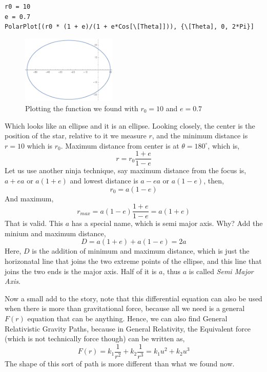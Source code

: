 \documentclass[12pt,a4paper]{article}
\begin{document}
\begin{verbatim}
r0 = 10
e = 0.7 
PolarPlot[(r0 * (1 + e)/(1 + e*Cos[\[Theta]])), {\[Theta], 0, 2*Pi}] 
\end{verbatim}

\begin{figure}[ht!]
    \centering
    \includegraphics[width=0.4\textwidth]{aellipse.pdf}
    \caption{Plotting the function we found with $r_0=10$ and $e = 0.7$}
    \label{fig:}
\end{figure}

Which looks like an ellipse and it is an ellipse. Looking closely, the center is the position of the star, relative to it we measure $r$, and the minimum distance is $r=10$ which is $r_0$. Maximum distance from center is at $\theta = 180^{\circ}$, which is, 
\[ 
r = r_0 \frac{1+ e}{1 - e}
\]
Let us use another ninja technique, say maximum distance from the focus is, $a + ea$ or $a \left( 1 +e \right) $ and lowest distance is $a - ea$ or $a \left( 1 -e \right) $, then, 
\[ 
    r_0 = a \left( 1 -e \right) 
\] 
And maximum,
\[ 
    r_{ max } = a\left( 1 -e \right) \frac{1+e}{1-e} = a\left( 1 + e \right) 
\] That is valid. 
This $a$ has a special name, which is semi major axis. Why? Add  the minium and maximum distance,
\[ 
    D = a(1+e) + a(1-e) = 2a
\]Here, $D$ is the addition of minimum and maximum distance, which is just the horizonatal line that joins the two extreme points of the ellipse, and this line that joins the two ends is the major axis. Half of it is $a$, thus $a$ is called  \emph{Semi Major Axis}.


Now a small add to the story, note  that this differential equation can also be used when there is more than gravitational force, because all we need is a general $F(r)$ equation that can be anything. Hence, we can also find General Relativistic Gravity Paths, because in General Relativity, the Equivalent force (which is not technically force though) can be written as,
\[ 
    F(r) = k_1 \frac{1}{r^2} + k_2 \frac{1}{r^3} = k_1 u^2 + k_2 u^3
\]
The shape of this sort of path is more different than what we found now.
\\
\end{document}
